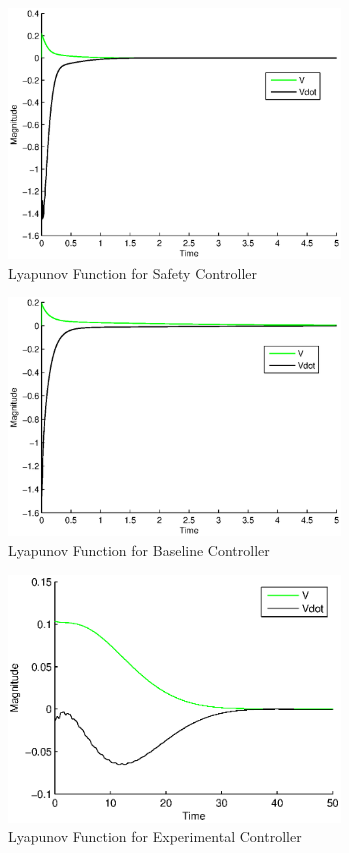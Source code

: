 \documentclass[conference]{IEEEtran}
\begin{document}
\begin{figure}[htp]
\centering
\includegraphics[width=250pt]{lyapSafe}
\caption{Lyapunov Function for Safety Controller}\label{fig:lyapSafe}
\end{figure}

\begin{figure}[htp]
\centering
\includegraphics[width=250pt]{lyapBase}
\caption{Lyapunov Function for Baseline Controller}\label{fig:lyapBase}
\end{figure}

\begin{figure}[htp]
\centering
\includegraphics[width=250pt]{lyapExp}
\caption{Lyapunov Function for Experimental Controller}\label{fig:lyapExp}
\end{figure}
\end{document}
